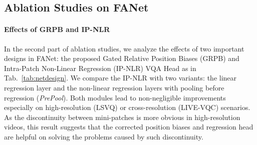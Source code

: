 \documentclass[runningheads]{llncs}
\begin{document}
\begin{table}
\setlength\tabcolsep{5pt}
\renewcommand\arraystretch{1.15}
\footnotesize
\vspace{-22pt}
\caption{Ablation study on FANet design: the effects for GRPB and IP-NLR modules.} 
\centering
{}
\label{tab:netdesign}
\vspace{-22pt}
\end{table}


\subsection{Ablation Studies on FANet}


\paragraph{Effects of GRPB and IP-NLR} In the second part of ablation studies, we analyze the effects of two important designs in FANet: the proposed Gated Relative Position Biases (GRPB) and Intra-Patch Non-Linear Regression (IP-NLR) VQA Head as in Tab.~\ref{tab:netdesign}. We compare the IP-NLR with two variants: the linear regression layer and the non-linear regression layers with pooling before regression (\textit{PrePool}). Both modules lead to non-negligible improvements especially on high-resolution (LSVQ) or cross-resolution (LIVE-VQC) scenarios. As  the discontinuity between mini-patches is more obvious in high-resolution videos, this result suggests that the corrected position biases and regression head are helpful on solving the problems caused by such discontinuity.
\end{document}
